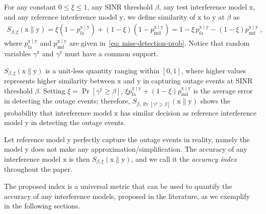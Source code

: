 \documentclass[12pt, draftclsnofoot, onecolumn]{IEEEtran}
\begin{document}
\begin{defin}\label{def: IMS-index}
For any constant $0 \leq \xi \leq 1$, any SINR threshold $\beta$, any test interference model $\mathrm{x}$, and any reference interference model $\mathrm{y}$, we define similarity of $\mathrm{x}$ to $\mathrm{y}$ at $\beta$ as
\begin{align}\label{eq: Definition-IMSindex}
S_{\beta,\xi}\left(\mathrm{x}\|\mathrm{y} \right)  = \xi \left( 1 - p_{\mathrm{fa}}^{\mathrm{x} \mid \mathrm{y}}\right) + \left( 1 - \xi \right) \left( 1 - p_{\mathrm{md}}^{\mathrm{x} \mid \mathrm{y}}\right) = 1 - \xi \, p_{\mathrm{fa}}^{\mathrm{x} \mid \mathrm{y}} - \left( 1 - \xi \right) p_{\mathrm{md}}^{\mathrm{x} \mid \mathrm{y}} \:,
\end{align}
where $p_{\mathrm{fa}}^{\mathrm{x} \mid \mathrm{y}}$ and $p_{\mathrm{md}}^{\mathrm{x} \mid \mathrm{y}}$ are given in~\eqref{eq: miss-detection-prob}. Notice that random variables $\gamma^{\mathrm{x}}$ and $\gamma^{\mathrm{y}}$ must have a common support.
\end{defin}

$S_{\beta,\xi}\left(\mathrm{x}\|\mathrm{y} \right)$ is a unit-less  quantity ranging within $[0,1]$, where higher values represents higher similarity between $\mathrm{x}$ and $\mathrm{y}$ in capturing outage events at SINR threshold $\beta$. Setting $\xi = \Pr \left[ \gamma^{\mathrm{y}} \geq \beta \right]$, $\xi p_{\mathrm{fa}}^{\mathrm{x} \mid \mathrm{y}} + \left( 1 - \xi \right) p_{\mathrm{md}}^{\mathrm{x} \mid \mathrm{y}}$ is the average error in detecting the outage events; therefore, $S_{\beta,\Pr \left[\gamma^{\mathrm{y}} \geq \beta \right]}\left(\mathrm{x}\|\mathrm{y} \right)$ shows the probability that interference model $\mathrm{x}$ has similar decision as reference interference model $\mathrm{y}$ in detecting the outage events.
\begin{remark}\label{result: accuracy-index}
Let reference model $\mathrm{y}$ perfectly capture the outage events in reality, namely the model $\mathrm{y}$ does not make any approximation/simplification. The accuracy of any interference model $\mathrm{x}$ is then $S_{\beta,\xi}\left(\mathrm{x}\|\mathrm{y} \right)$, and we call it the \emph{accuracy index} throughout the paper.
\end{remark}
The proposed index is a universal metric that can be used to quantify the accuracy of any interference models, proposed in the literature, as we exemplify in the following sections.
\end{document}
